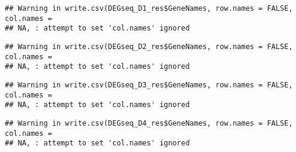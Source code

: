 \documentclass[]{article}
\newenvironment{Shaded}{\begin{snugshade}}{\end{snugshade}}
\newcommand{\DataTypeTok}[1]{\textcolor[rgb]{0.13,0.29,0.53}{#1}}
\newcommand{\KeywordTok}[1]{\textcolor[rgb]{0.13,0.29,0.53}{\textbf{#1}}}
\newcommand{\NormalTok}[1]{#1}
\newcommand{\OperatorTok}[1]{\textcolor[rgb]{0.81,0.36,0.00}{\textbf{#1}}}
\newcommand{\OtherTok}[1]{\textcolor[rgb]{0.56,0.35,0.01}{#1}}
\newcommand{\StringTok}[1]{\textcolor[rgb]{0.31,0.60,0.02}{#1}}
\begin{document}
\begin{verbatim}
## Warning in write.csv(DEGseq_D1_res$GeneNames, row.names = FALSE, col.names =
## NA, : attempt to set 'col.names' ignored
\end{verbatim}

\begin{Shaded}
\end{Shaded}

\begin{verbatim}
## Warning in write.csv(DEGseq_D2_res$GeneNames, row.names = FALSE, col.names =
## NA, : attempt to set 'col.names' ignored
\end{verbatim}

\begin{Shaded}
\end{Shaded}

\begin{verbatim}
## Warning in write.csv(DEGseq_D3_res$GeneNames, row.names = FALSE, col.names =
## NA, : attempt to set 'col.names' ignored
\end{verbatim}

\begin{Shaded}
\end{Shaded}

\begin{verbatim}
## Warning in write.csv(DEGseq_D4_res$GeneNames, row.names = FALSE, col.names =
## NA, : attempt to set 'col.names' ignored
\end{verbatim}
\end{document}
